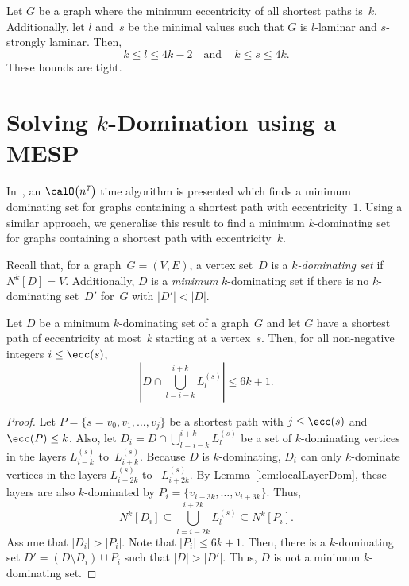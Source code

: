 \begin{theorem}
Let \( G \) be a graph where the minimum eccentricity of all shortest paths is~\( k \).
Additionally, let $l$ and~$s$ be the minimal values such that $G$ is \( l \)-laminar and \( s \)-strongly laminar.
Then,
\[
    k \leq l \leq 4k - 2 \quad \text{and} \, \quad k \leq s \leq 4k.
\]
These bounds are tight.
\end{theorem}


\section{Solving $k$-Domination using a MESP}
    \label{sec:kDom}

In~\cite{Kratsch2000}, an $\calO \big( n^7 \big)$ time algorithm is presented which finds a minimum dominating set for graphs containing a shortest path with eccentricity~$1$.
Using a similar approach, we generalise this result to find a minimum $k$-dominating set for graphs containing a shortest path with eccentricity~$k$.

Recall that, for a graph~$G = (V, E)$, a vertex set~$D$ is a \emph{\( k \)-dominating set} if $N^k[D] = V$.
Additionally, $D$ is a \emph{minimum} $k$-dominating set if there is no $k$-dominating set~$D'$ for~$G$ with $|D'| < |D|$.

\begin{lemma}
    \label{lem:domCardinality}
Let \( D \) be a minimum \( k \)-dominating set of a graph~\( G \) and let \( G \) have a shortest path of eccentricity at most~\( k \) starting at a vertex~\( s \).
Then, for all non-negative integers \( i \leq \ecc(s) \),
\[
    \left| D \cap \bigcup_{l=i-k}^{i+k} L_l^{(s)} \right| \leq 6k + 1.
\]
\end{lemma}

\begin{proof}
Let $P = \{ s = v_0, v_1, \ldots, v_j \}$ be a shortest path with $j \leq \ecc(s)$  and $\ecc(P) \leq k$.
Also, let $D_{i} = D \cap \bigcup_{l=i-k}^{i+k} L_l^{(s)}$ be a set of $k$-dominating vertices in the layers $L_{i-k}^{(s)}$ to~$L_{i+k}^{(s)}$.
Because $D$ is $k$-dominating, $D_{i}$ can only $k$-dominate vertices in the layers $L_{i-2k}^{(s)}$ to ~$L_{i+2k}^{(s)}$.
By Lemma~\ref{lem:localLayerDom}, these layers are also $k$-dominated by $P_{i} = \{ v_{i-3k}, \ldots, v_{i+3k} \}$.
Thus,
\[
    N^k[D_{i}] \subseteq \bigcup_{l=i-2k}^{i+2k} L_l^{(s)} \subseteq N^k[P_{i}].
\]
Assume that $|D_{i}| > |P_{i}|$.
Note that $|P_{i}| \leq 6k + 1$.
Then, there is a $k$-dominating set $D' = (D \setminus D_{i}) \cup P_{i}$ such that $|D| > |D'|$.
Thus, $D$ is not a minimum $k$-dominating set.
\end{proof}

